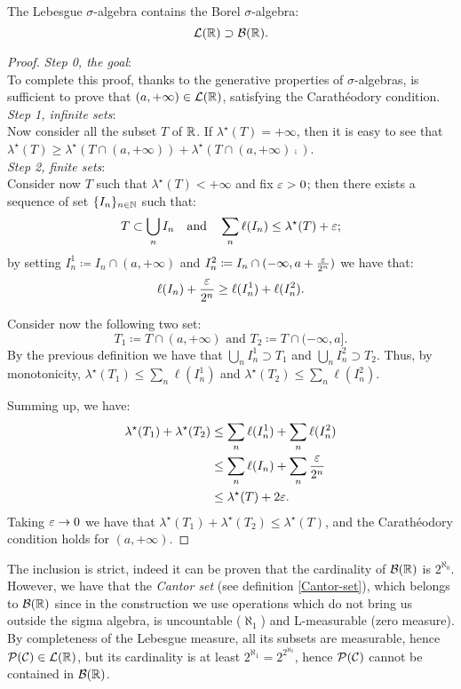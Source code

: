 \begin{prop}\label{Borel-sets-are-Lebesgue-sets}
	The Lebesgue $\sigma$-algebra contains the Borel $\sigma$-algebra:
	$$\mathcal L(\mathbb R) \supset \mathcal B(\mathbb R).$$
\end{prop}
\begin{proof} \textit{Step 0, the goal}:\\
	To complete this proof, thanks to the generative properties of $\sigma$-algebras, is sufficient to prove that $(a,+\infty) \in \mathcal L(\mathbb R)$, satisfying the Carathéodory condition.\\
	\textit{Step 1, infinite sets}: \\
	Now consider all the subset $T$ of $\mathbb R$.
	If $\lambda^\star(T)=+\infty$, then it is easy to see that $\lambda^\star(T) \geq \lambda^\star(T \cap (a, +\infty)) + \lambda^\star(T \cap (a, +\infty)\comp)$.\\
	\textit{Step 2, finite sets}:\\
	Consider now $T$ such that $\lambda^\star(T)<+\infty$ and fix $\varepsilon > 0$; then there exists a sequence of set $\{I_n\}_{n \in \mathbb N}$ such that:
	$$
		T \subset \bigcup_n I_n
		\quad  \text{and} \quad
		\sum_n \ell(I_n)
		\leq \lambda^\star(T) + \varepsilon
	;
	$$
	by setting $I_n^1 \coloneqq I_n\cap (a,+\infty)$ and $I_n^2 \coloneqq I_n\cap (-\infty,a+\tfrac{\varepsilon}{2^n})$ we have that:
	$$
		\ell(I_n)+\frac{\varepsilon}{2^n}
		\geq \ell(I_n^1)+\ell(I_n^2)
	.
	$$

	Consider now the following two set:
	$$
		T_1
		\coloneqq T\cap (a,+\infty) 
		\text{ and } 
		T_2
		\coloneqq T\cap (-\infty,a]
	.
	$$
	By the previous definition we have that $\bigcup_n I_n^1 \supset T_1$ and $\bigcup_n I_n^2 \supset T_2$. Thus, by monotonicity, $\lambda^\star(T_1)\leq \sum_n\ell(I_n^1)$ and $\lambda^\star(T_2)\leq \sum_n\ell(I_n^2)$.
	
	Summing up, we have:
	\begin{align*}
	\lambda^\star(T_1)+\lambda^\star(T_2) &\leq \sum_n\ell(I_n^1) + \sum_n\ell(I_n^2) \\
	&\leq \sum_n\ell(I_n) + \sum_n\frac{\varepsilon}{2^n} \\
	&\leq \lambda^\star(T) + 2\varepsilon.
	\end{align*}
	Taking $\varepsilon \to 0$ we have that $\lambda^\star(T_1)+\lambda^\star(T_2)  \leq  \lambda^\star(T)$, and the Carathéodory condition holds for $(a, +\infty)$.
\end{proof}

The inclusion is strict, indeed it can be proven that the cardinality of $\mathcal B(\mathbb R)$ is $2^{\aleph_0}$. However, we have that the \emph{Cantor set} (see definition \vref{Cantor-set}), which belongs to $\mathcal B(\mathbb R)$ since in the construction we use operations which do not bring us outside the sigma algebra, is uncountable ($\aleph_1$) and L-measurable (zero measure). By completeness of the Lebesgue measure, all its subsets are measurable, hence $\mathcal P(\mathcal C)\in\mathcal L(\mathbb R)$, but its cardinality is at least $2^{\aleph_1}=2^{2^{\aleph_0}}$, hence $\mathcal P(\mathcal C)$ cannot be contained in $\mathcal B(\mathbb R)$.

